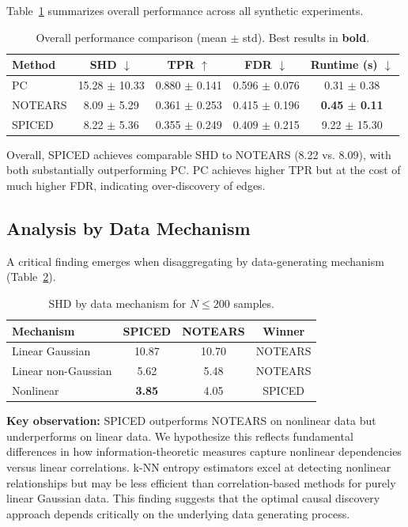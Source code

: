 \documentclass{article}
\begin{document}
Table~\ref{tab:main_results} summarizes overall performance across all synthetic experiments.

\begin{table}[t]
\caption{Overall performance comparison (mean $\pm$ std). Best results in \textbf{bold}.}
\label{tab:main_results}
\centering
\begin{tabular}{lcccc}
\toprule
Method & SHD $\downarrow$ & TPR $\uparrow$ & FDR $\downarrow$ & Runtime (s) $\downarrow$ \\
\midrule
PC & 15.28 $\pm$ 10.33 & 0.880 $\pm$ 0.141 & 0.596 $\pm$ 0.076 & 0.31 $\pm$ 0.38 \\
NOTEARS & 8.09 $\pm$ 5.29 & 0.361 $\pm$ 0.253 & 0.415 $\pm$ 0.196 & \textbf{0.45 $\pm$ 0.11} \\
SPICED & 8.22 $\pm$ 5.36 & 0.355 $\pm$ 0.249 & 0.409 $\pm$ 0.215 & 9.22 $\pm$ 15.30 \\
\bottomrule
\end{tabular}
\end{table}

Overall, SPICED achieves comparable SHD to NOTEARS (8.22 vs. 8.09), with both substantially outperforming PC. PC achieves higher TPR but at the cost of much higher FDR, indicating over-discovery of edges.

\subsection{Analysis by Data Mechanism}

A critical finding emerges when disaggregating by data-generating mechanism (Table~\ref{tab:mechanism}).

\begin{table}[t]
\caption{SHD by data mechanism for $N \leq 200$ samples.}
\label{tab:mechanism}
\centering
\begin{tabular}{lccc}
\toprule
Mechanism & SPICED & NOTEARS & Winner \\
\midrule
Linear Gaussian & 10.87 & 10.70 & NOTEARS \\
Linear non-Gaussian & 5.62 & 5.48 & NOTEARS \\
Nonlinear & \textbf{3.85} & 4.05 & SPICED \\
\bottomrule
\end{tabular}
\end{table}

\textbf{Key observation:} SPICED outperforms NOTEARS on nonlinear data but underperforms on linear data. We hypothesize this reflects fundamental differences in how information-theoretic measures capture nonlinear dependencies versus linear correlations. k-NN entropy estimators excel at detecting nonlinear relationships but may be less efficient than correlation-based methods for purely linear Gaussian data. This finding suggests that the optimal causal discovery approach depends critically on the underlying data generating process.
\end{document}
